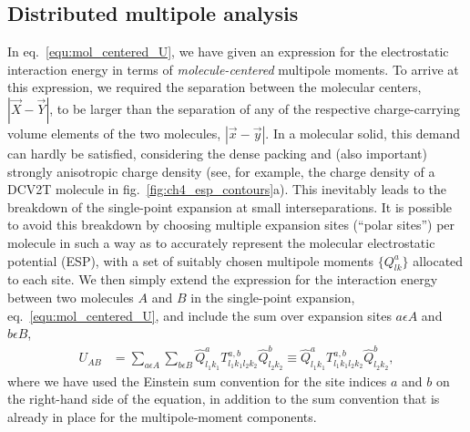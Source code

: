 \subsection{Distributed multipole analysis}
\label{sec:distributed_multipoles}



In eq.~\ref{equ:mol_centered_U}, we have given an expression for the electrostatic interaction energy in terms of {\em molecule-centered} multipole moments. To arrive at this expression, we required the separation between the molecular centers, $|\vec{X}-\vec{Y}|$, to be larger than the separation of any of the respective charge-carrying volume elements of the two molecules, $|\vec{x}-\vec{y}|$. In a molecular solid, this demand can hardly be satisfied, considering the dense packing and (also important) strongly anisotropic charge density (see, for example, the charge density of a DCV2T molecule in fig.~\ref{fig:ch4_esp_contours}a). This inevitably leads to the breakdown of the single-point expansion at small interseparations. It is possible to avoid this breakdown by choosing multiple expansion sites (``polar sites'') per molecule in such a way as to accurately represent the molecular electrostatic potential (ESP), with a set of suitably chosen multipole moments $\{Q_{lk}^a\}$ allocated to each site. We then simply extend the expression for the interaction energy between two molecules $A$ and $B$ in the single-point expansion, eq.~\ref{equ:mol_centered_U}, and include the sum over expansion sites $a\epsilon A$ and $b\epsilon B$,
\begin{align}
 U_{AB} & = \sum_{a\epsilon A} \sum_{b\epsilon B} \hat{Q}_{l_1k_1}^a T_{l_1k_1l_2k_2}^{a,b} \hat{Q}_{l_2k_2}^b \equiv  \hat{Q}_{l_1k_1}^a T_{l_1k_1l_2k_2}^{a,b} \hat{Q}_{l_2k_2}^b,
 \label{equ:mol_distributed_U}
\end{align}
where we have used the Einstein sum convention for the site indices $a$ and $b$ on the right-hand side of the equation, in addition to the sum convention that is already in place for the multipole-moment components.

